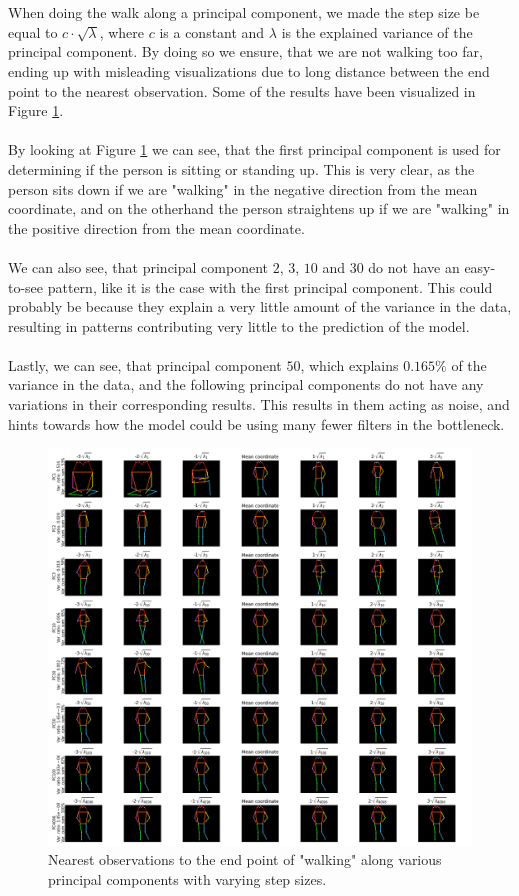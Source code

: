 \documentclass[./main.tex]{subfiles}
\begin{document}
\\
\\
When doing the walk along a principal component, we made the step size be equal to $c \cdot \sqrt{\lambda}$, where $c$ is a constant and $\lambda$ is the explained variance of the principal component. By doing so we ensure, that we are not walking too far, ending up with misleading visualizations due to long distance between the end point to the nearest observation. Some of the results have been visualized in Figure \ref{fig:shape_analysis}.
\\
\\
By looking at Figure \ref{fig:shape_analysis} we can see, that the first principal component is used for determining if the person is sitting or standing up. This is very clear, as the person sits down if we are "walking" in the negative direction from the mean coordinate, and on the otherhand the person straightens up if we are "walking" in the positive direction from the mean coordinate.
\\
\\
We can also see, that principal component $2$, $3$, $10$ and $30$ do not have an easy-to-see pattern, like it is the case with the first principal component. This could probably be because they explain a very little amount of the variance in the data, resulting in patterns contributing very little to the prediction of the model.
\\
\\
Lastly, we can see, that principal component $50$, which explains $0.165\%$ of the variance in the data, and the following principal components do not have any variations in their corresponding results. This results in them acting as noise, and hints towards how the model could be using many fewer filters in the bottleneck.
\begin{figure}[htbp]
    \centering
    \includegraphics[width = \textwidth]{entities/shape_analysis.png}
    \caption{Nearest observations to the end point of "walking" along various principal components with varying step sizes.}
    \label{fig:shape_analysis}
\end{figure}
\end{document}
